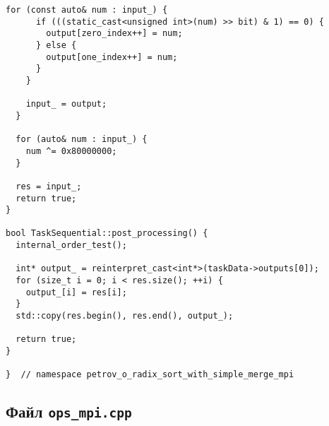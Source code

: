 \documentclass[12pt]{article}
\begin{document}
\begin{lstlisting}[caption={Параллельная версия поразрядной сортировки с использованием MPI}]
    for (const auto& num : input_) {
      if (((static_cast<unsigned int>(num) >> bit) & 1) == 0) {
        output[zero_index++] = num;
      } else {
        output[one_index++] = num;
      }
    }

    input_ = output;
  }

  for (auto& num : input_) {
    num ^= 0x80000000;
  }

  res = input_;
  return true;
}

bool TaskSequential::post_processing() {
  internal_order_test();

  int* output_ = reinterpret_cast<int*>(taskData->outputs[0]);
  for (size_t i = 0; i < res.size(); ++i) {
    output_[i] = res[i];
  }
  std::copy(res.begin(), res.end(), output_);

  return true;
}

}  // namespace petrov_o_radix_sort_with_simple_merge_mpi
\end{lstlisting}

\subsection*{Файл \texttt{ops\_mpi.cpp}}
\end{document}
